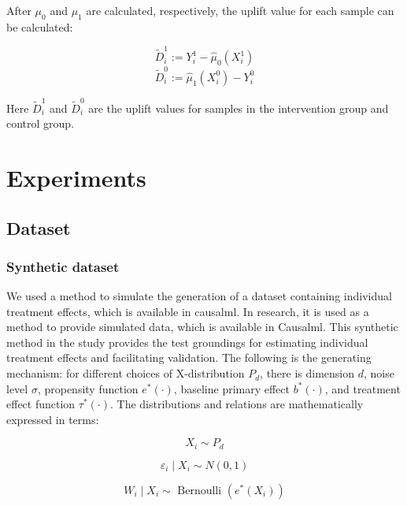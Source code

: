 \documentclass[sigconf,screen]{acmart}
\begin{document}
After $\mu_{0}$ and $\mu_{1}$ are calculated, respectively, the uplift value for each sample can be calculated:

\begin{equation}
     \tilde{D}_{i}^{1}:=Y_{i}^{1}-\hat{\mu}_{0}\left(X_{i}^{1}\right)
\end{equation}
\begin{equation}
     \tilde{D}_{i}^{0}:=\hat{\mu}_{1}\left(X_{i}^{0}\right)-Y_{i}^{0} 
\end{equation}

Here $\tilde{D}_{i}^{1}$ and $\tilde{D}_{i}^{0}$ are the uplift values for samples in the intervention group and control group.

\section{Experiments}
\subsection{Dataset}
\subsubsection{Synthetic dataset}

We used a method to simulate the generation of a dataset containing individual treatment effects, which is available in causalml. In \citet{ML:Chen} research,  it is used as a method to provide simulated data, which is available in Causalml. This synthetic method in the study provides the test groundings for estimating individual treatment effects and facilitating validation. The following is the generating mechanism:  for different choices of X-distribution $P_{d}$, there is dimension $d$, noise level $\sigma$, propensity function $e^\ast(\cdot)$, baseline primary effect $b^\ast(\cdot)$, and treatment effect function $\tau^\ast(\cdot)$. The distributions and relations are mathematically expressed in terms: 

\begin{equation}
    X_{i} \sim P_{d}
\end{equation}

\begin{equation}
    \varepsilon_{i} \mid X_{i} \sim N(0,1)
\end{equation}

\begin{equation}
    W_{i} \mid X_{i} \sim \text { Bernoulli }\left(e^{*}\left(X_{i}\right)\right)
\end{equation}
\end{document}

